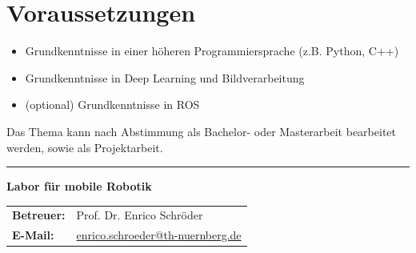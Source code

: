 \documentclass{ohm_project_description}
\begin{document}
\section*{Voraussetzungen}
\begin{itemize}[leftmargin=0.5cm]
    \setlength\itemsep{.1em}
    \item Grundkenntnisse in einer höheren Programmiersprache (z.B. Python, C++)
    \item Grundkenntnisse in Deep Learning und Bildverarbeitung
    \item (optional) Grundkenntnisse in ROS
\end{itemize}

\vspace{0.5cm}
Das Thema kann nach Abstimmung als Bachelor- oder Masterarbeit bearbeitet werden, sowie als Projektarbeit. 


\vfill
\textcolor{ohm_red}{\rule{\linewidth}{0.4mm}}
\textbf{\textcolor{ohm_red}{Labor für mobile Robotik}} \\
\begin{tabular}{@{}ll}
\textbf{Betreuer:} & Prof. Dr. Enrico Schröder \\
\textbf{E-Mail:}   & \href{mailto:enrico.schroeder@th-nuernberg.de}{enrico.schroeder@th-nuernberg.de} \\
\end{tabular}
\end{document}

